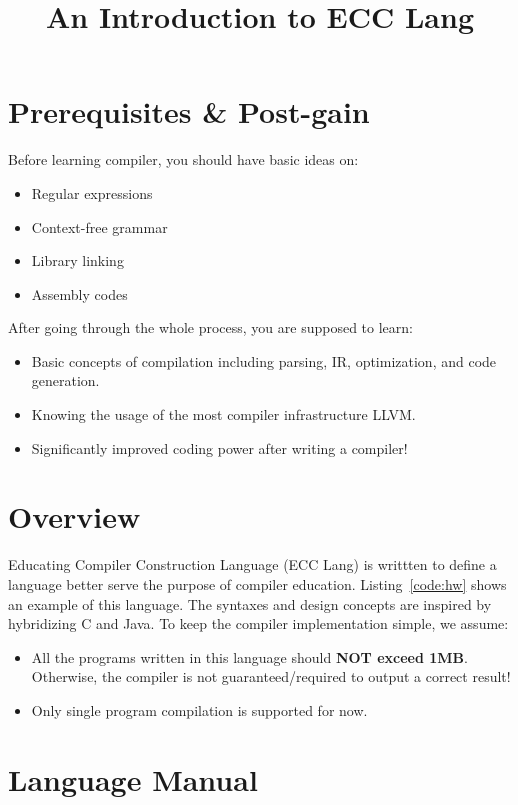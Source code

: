 \documentclass{article}
\title{An Introduction to ECC Lang}
\date{}
\begin{document}
\maketitle

\section{Prerequisites \& Post-gain}

Before learning compiler, you should have basic ideas on:
\begin{itemize}
  \item Regular expressions
  \item Context-free grammar
  \item Library linking
  \item Assembly codes
\end{itemize}

After going through the whole process, you are supposed to learn:
\begin{itemize}
  \item Basic concepts of compilation including parsing, IR, optimization, and code generation.
  \item Knowing the usage of the most compiler infrastructure LLVM.
  \item Significantly improved coding power after writing a compiler!
\end{itemize}

\section{Overview}

Educating Compiler Construction Language (ECC Lang) is writtten to define
a language better serve the purpose of compiler education.
Listing~\ref{code:hw} shows an example of this language.
The syntaxes and design concepts are inspired by hybridizing C and Java.
To keep the compiler implementation simple, we assume:
\begin{itemize}
  \item All the programs written in this language should \textbf{NOT exceed 1MB}.
    Otherwise, the compiler is not guaranteed/required to output a correct result!
  \item Only single program compilation is supported for now.
\end{itemize}

\section{Language Manual}
\end{document}
